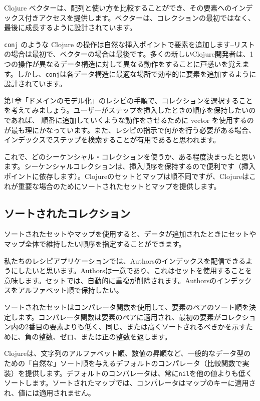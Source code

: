 Clojure ベクターは、配列と使い方を比較することができ、その要素へのインデックス付きアクセスを提供します。ベクターは、コレクションの最初ではなく、最後に成長するように設計されています。

\texttt{conj} のような Clojure の操作は自然な挿入ポイントで要素を追加します--リストの場合は最初で、ベクターの場合は最後です。多くの新しいClojure開発者は、1つの操作が異なるデータ構造に対して異なる動作をすることに戸惑いを覚えます。しかし、\texttt{conj}は各データ構造に最適な場所で効率的に要素を追加するように設計されています。
 
第1章「ドメインのモデル化」のレシピの手順で、コレクションを選択することを考えてみましょう。ユーザーがステップを挿入したときの順序を保持したいのであれば、 順番に追加していくような動作をさせるために vector を使用するのが最も理にかなっています。また、レシピの指示で何かを行う必要がある場合、インデックスでステップを検索することが有用であると思われます。

これで、どのシーケンシャル・コレクションを使うか、ある程度決まったと思います。シーケンシャルコレクションは、挿入順序を保持するので便利です（挿入ポイントに依存します）。Clojureのセットとマップは順不同ですが、Clojureはこれが重要な場合のためにソートされたセットとマップを提供します。

\subsection{ソートされたコレクション}

ソートされたセットやマップを使用すると、データが追加されたときにセットやマップ全体で維持したい順序を指定することができます。

私たちのレシピアプリケーションでは、Authorsのインデックスを配信できるようにしたいと思います。Authorsは一意であり、これはセットを使用することを意味します。セットでは、自動的に重複が削除されます。Authorsのインデックスをアルファベット順で保持したい。

ソートされたセットはコンパレータ関数を使用して、要素のペアのソート順を決定します。コンパレータ関数は要素のペアに適用され、最初の要素がコレクション内の2番目の要素よりも低く、同じ、または高くソートされるべきかを示すために、負の整数、ゼロ、または正の整数を返します。

Clojureは、文字列のアルファベット順、数値の昇順など、一般的なデータ型のための「自然な」ソート順を与えるデフォルトのコンパレータ（比較関数で実装）を提供します。デフォルトのコンパレータは、常に\texttt{nil}を他の値よりも低くソートします。ソートされたマップでは、コンパレータはマップのキーに適用され、値には適用されません。


